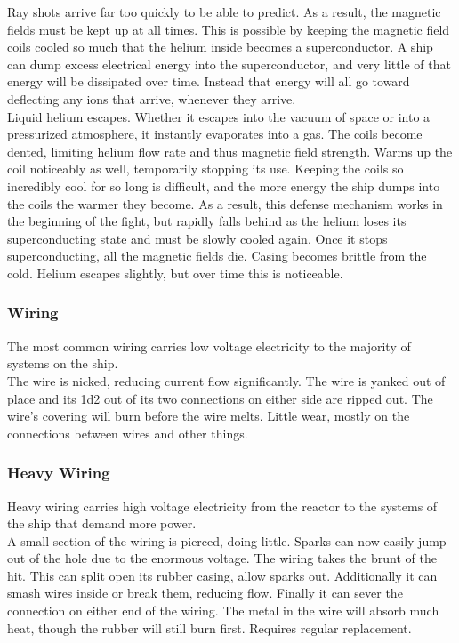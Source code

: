 \documentclass[a4paper]{article}
\begin{document}
Ray shots arrive far too quickly to be able to predict. As a result, the magnetic fields must be kept up at all times. This is possible by keeping the magnetic field coils cooled so much that the helium inside becomes a superconductor. A ship can dump excess electrical energy into the superconductor, and very little of that energy will be dissipated over time. Instead that energy will all go toward deflecting any ions that arrive, whenever they arrive.
\\ \pbhw
{Liquid helium escapes. Whether it escapes into the vacuum of space or into a pressurized atmosphere, it instantly evaporates into a gas. }
{The coils become dented, limiting helium flow rate and thus magnetic field strength. Warms up the coil noticeably as well, temporarily stopping its use.}
{Keeping the coils so incredibly cool for so long is difficult, and the more energy the ship dumps into the coils the warmer they become. As a result, this defense mechanism works in the beginning of the fight, but rapidly falls behind as the helium loses its superconducting state and must be slowly cooled again. Once it stops superconducting, all the magnetic fields die.}
{Casing becomes brittle from the cold. Helium escapes slightly, but over time this is noticeable.}


\vspace{-0.5cm} \hspace{-18pt} \subsubsection{Wiring} \label{grid_wiring} \vspace{-0.2cm}
The most common wiring carries low voltage electricity to the majority of systems on the ship.
\\ \pbhw
{The wire is nicked, reducing current flow significantly.}
{The wire is yanked out of place and its 1d2 out of its two connections on either side are ripped out.}
{The wire's covering will burn before the wire melts.}
{Little wear, mostly on the connections between wires and other things.}


\vspace{-0.5cm} \hspace{-18pt} \subsubsection{Heavy Wiring} \label{grid_heavy_wiring} \vspace{-0.2cm}
Heavy wiring carries high voltage electricity from the reactor to the systems of the ship that demand more power.
\\ \pbhw
{A small section of the wiring is pierced, doing little. Sparks can now easily jump out of the hole due to the enormous voltage.}
{The wiring takes the brunt of the hit. This can split open its rubber casing, allow sparks out. Additionally it can smash wires inside or break them, reducing flow. Finally it can sever the connection on either end of the wiring.}
{The metal in the wire will absorb much heat, though the rubber will still burn first.}
{Requires regular replacement.}
\end{document}
